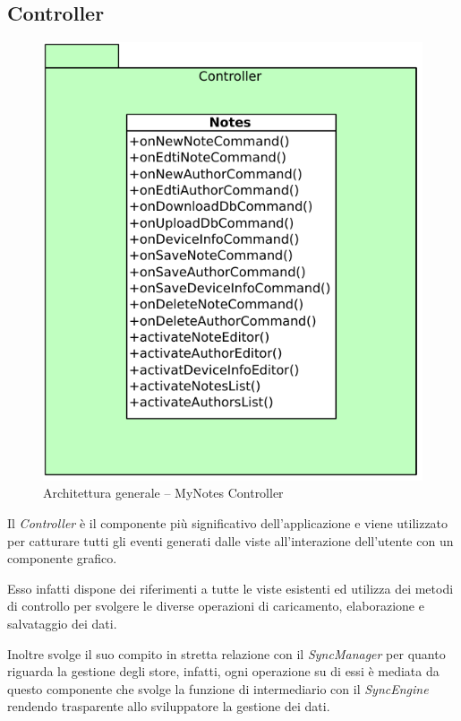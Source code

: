 \subsection{Controller}
\begin{figure}[htb]
\centering
\includegraphics[scale=0.6]{gfx/class/MyNotes_Controller.pdf}
\caption{Architettura generale -- MyNotes Controller}
\label{fig:architettura MyNotes Controller}
\end{figure}
Il \emph{Controller} è il componente più significativo dell'applicazione e viene utilizzato per catturare tutti gli eventi generati dalle viste all'interazione dell'utente con un componente grafico.

Esso infatti dispone dei riferimenti a tutte le viste esistenti ed utilizza dei metodi di controllo per svolgere le diverse operazioni di caricamento, elaborazione e salvataggio dei dati.

Inoltre svolge il suo compito in stretta relazione con il \emph{SyncManager} per quanto riguarda la gestione degli store, infatti, ogni operazione su di essi è mediata da questo componente che svolge la funzione di intermediario con il \emph{SyncEngine} rendendo trasparente allo sviluppatore la gestione dei dati.


